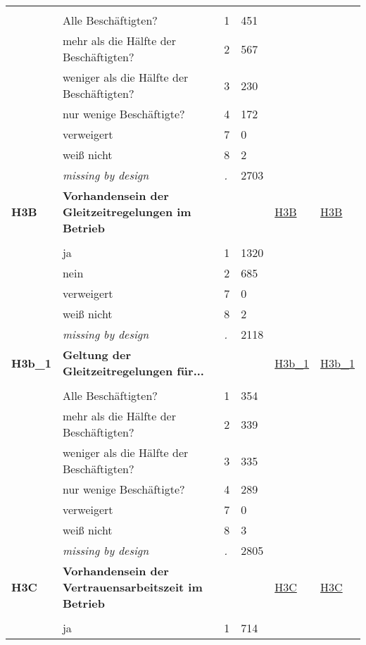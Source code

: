 \begin{longtable}{| L{2.45cm} | L{6cm} | C{1.5cm} | R{1cm} | C{2.25cm} | C{2.25cm} |}
   &  &  &  &  &  \\ 
   & Alle Beschäftigten? & 1 & 451 &  &  \\ 
   & mehr als die Hälfte der Beschäftigten? & 2 & 567 &  &  \\ 
   & weniger als die Hälfte der Beschäftigten? & 3 & 230 &  &  \\ 
   & nur wenige Beschäftigte? & 4 & 172 &  &  \\ 
   & verweigert & 7 & 0 &  &  \\ 
   & weiß nicht & 8 & 2 &  &  \\ 
   & \textit{missing by design} & \textit{.} & 2703 &  &  \\ 
   \midrule
\textbf{H3B}\label{var:H3B} & \textbf{Vorhandensein der Gleitzeitregelungen im Betrieb} &  &  & \hyperref[H3B]{H3B} & \hyperref[var:suf:H3B]{H3B} \\ 
   &  &  &  &  &  \\ 
   & ja & 1 & 1320 &  &  \\ 
   & nein & 2 & 685 &  &  \\ 
   & verweigert & 7 & 0 &  &  \\ 
   & weiß nicht & 8 & 2 &  &  \\ 
   & \textit{missing by design} & \textit{.} & 2118 &  &  \\ 
   \midrule
\textbf{H3b\_1}\label{var:H3b:1} & \textbf{Geltung der Gleitzeitregelungen für...} &  &  & \hyperref[H3b:1]{H3b\_1} & \hyperref[var:suf:H3b:1]{H3b\_1} \\ 
   &  &  &  &  &  \\ 
   & Alle Beschäftigten? & 1 & 354 &  &  \\ 
   & mehr als die Hälfte der Beschäftigten? & 2 & 339 &  &  \\ 
   & weniger als die Hälfte der Beschäftigten? & 3 & 335 &  &  \\ 
   & nur wenige Beschäftigte? & 4 & 289 &  &  \\ 
   & verweigert & 7 & 0 &  &  \\ 
   & weiß nicht & 8 & 3 &  &  \\ 
   & \textit{missing by design} & \textit{.} & 2805 &  &  \\ 
   \midrule
\textbf{H3C}\label{var:H3C} & \textbf{Vorhandensein der Vertrauensarbeitszeit im Betrieb} &  &  & \hyperref[H3C]{H3C} & \hyperref[var:suf:H3C]{H3C} \\ 
   &  &  &  &  &  \\ 
   & ja & 1 & 714 &  &  \\ 

\end{longtable}
